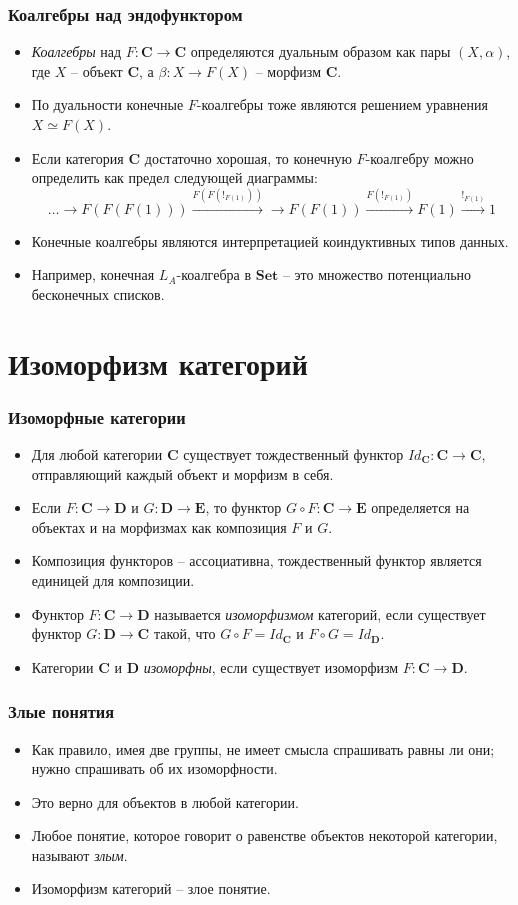 \documentclass{beamer}
\theoremstyle{definition}
\newcommand{\cat}[1]{\mathbf{#1}}
\renewcommand{\C}{\cat{C}}
\newcommand{\D}{\cat{D}}
\newcommand{\E}{\cat{E}}
\newcommand{\Set}{\cat{Set}}
\begin{document}
\begin{frame}
\frametitle{Коалгебры над эндофунктором}
\begin{itemize}
\item \emph{Коалгебры} над $F : \C \to \C$ определяются дуальным образом как пары $(X,\alpha)$, где $X$ -- объект $\C$, а $\beta : X \to F(X)$ -- морфизм $\C$.
\item По дуальности конечные $F$-коалгебры тоже являются решением уравнения $X \simeq F(X)$.
\item Если категория $\C$ достаточно хорошая, то конечную $F$-коалгебру можно определить как предел следующей диаграммы:
\[ \ldots \to F(F(F(1))) \xrightarrow{F(F(!_{F(1)}))} \to F(F(1)) \xrightarrow{F(!_{F(1)})} F(1) \xrightarrow{!_{F(1)}} 1 \]
\item Конечные коалгебры являются интерпретацией коиндуктивных типов данных.
\item Например, конечная $L_A$-коалгебра в $\Set$ -- это множество потенциально бесконечных списков.
\end{itemize}
\end{frame}

\section{Изоморфизм категорий}

\begin{frame}
\frametitle{Изоморфные категории}
\begin{itemize}
\item Для любой категории $\C$ существует тождественный функтор $Id_\C : \C \to \C$, отправляющий каждый объект и морфизм в себя.
\item Если $F : \C \to \D$ и $G : \D \to \E$, то функтор $G \circ F : \C \to \E$ определяется на объектах и на морфизмах как композиция $F$ и $G$.
\item Композиция функторов -- ассоциативна, тождественный функтор является единицей для композиции.
\item Функтор $F : \C \to \D$ называется \emph{изоморфизмом} категорий, если существует функтор $G : \D \to \C$ такой, что $G \circ F = Id_\C$ и $F \circ G = Id_\D$.
\item Категории $\C$ и $\D$ \emph{изоморфны}, если существует изоморфизм $F : \C \to \D$.
\end{itemize}
\end{frame}

\begin{frame}
\frametitle{Злые понятия}
\begin{itemize}
\item Как правило, имея две группы, не имеет смысла спрашивать равны ли они; нужно спрашивать об их изоморфности.
\item Это верно для объектов в любой категории.
\item Любое понятие, которое говорит о равенстве объектов некоторой категории, называют \emph{злым}.
\item Изоморфизм категорий -- злое понятие.
\end{itemize}
\end{frame}
\end{document}
